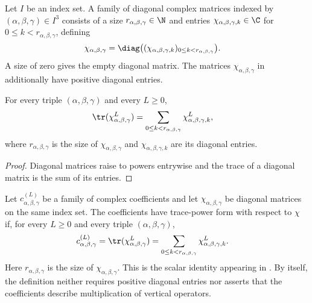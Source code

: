 \begin{definition}%
    \label{def:mpdo_diagonal_chi_family}
    \leanok
    Let $I$ be an index set. A family of diagonal complex matrices indexed
    by $(\alpha,\beta,\gamma)\in I^3$ consists of a size
    $r_{\alpha,\beta,\gamma}\in\N$ and entries
    $\chi_{\alpha,\beta,\gamma,k}\in\C$ for
    $0\le k<r_{\alpha,\beta,\gamma}$, defining
    \begin{align}
        \chi_{\alpha,\beta,\gamma}
         & =
        \diag\bigl(    (\chi_{\alpha,\beta,\gamma,k})_{0\le k<r_{\alpha,\beta,\gamma}}
        \bigr).
        \notag
    \end{align}
    A size of zero gives the empty diagonal matrix.
    The matrices $\chi_{\alpha,\beta,\gamma}$ in
    \cite[Theorem~4.14(ii)]{Cirac2016MPDO_arXiv} additionally have positive
    diagonal entries.
\end{definition}

\begin{lemma}%
    \label{thm:mpdo_trace_matrix_pow}
    \leanok
    For every triple $(\alpha, \beta, \gamma)$ and every $L \ge 0$,
    \begin{align}
        \tr(\chi_{\alpha,\beta,\gamma}^{L})
         & =
        \sum_{0\le k<r_{\alpha,\beta,\gamma}}
        \chi_{\alpha,\beta,\gamma,k}^{L},
        \notag
    \end{align}
    where $r_{\alpha,\beta,\gamma}$ is the size of
    $\chi_{\alpha,\beta,\gamma}$ and $\chi_{\alpha,\beta,\gamma,k}$ are its
    diagonal entries.
\end{lemma}
\begin{proof}\leanok
    Diagonal matrices raise to powers entrywise and the trace of a diagonal matrix
    is the sum of its entries.
\end{proof}

\begin{definition}%
    \label{def:mpdo_has_chi_trace_power_form}
    \leanok
    Let $c^{(L)}_{\alpha,\beta,\gamma}$ be a family of complex coefficients
    and let $\chi_{\alpha,\beta,\gamma}$ be diagonal matrices on the same
    index set. The coefficients have trace-power form with respect to
    $\chi$ if, for every $L\ge0$ and every triple $(\alpha,\beta,\gamma)$,
    \begin{align}
        c^{(L)}_{\alpha,\beta,\gamma}
         & =
        \tr(\chi_{\alpha,\beta,\gamma}^{L})
        =
        \sum_{0\le k<r_{\alpha,\beta,\gamma}}
        \chi_{\alpha,\beta,\gamma,k}^{L}.
        \notag
    \end{align}
    Here $r_{\alpha,\beta,\gamma}$ is the size of
    $\chi_{\alpha,\beta,\gamma}$. This is the scalar identity appearing in
    \cite[Theorem~4.14(ii)]{Cirac2016MPDO_arXiv}. By itself, the definition
    neither requires positive diagonal entries nor asserts that the
    coefficients describe multiplication of vertical operators.
\end{definition}
